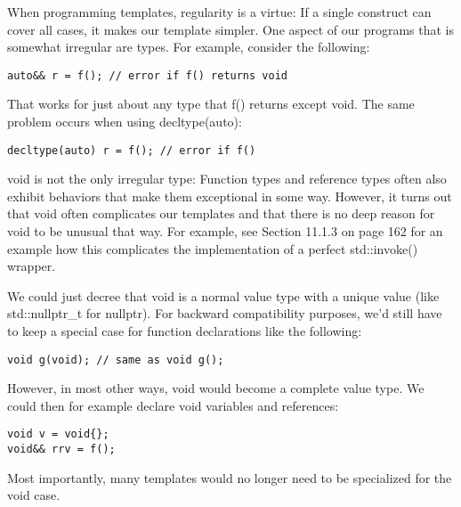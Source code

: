 When programming templates, regularity is a virtue: If a single construct can cover all cases, it makes our template simpler. One aspect of our programs that is somewhat irregular are types. For example, consider the following:

\begin{lstlisting}[style=styleCXX]
auto&& r = f(); // error if f() returns void
\end{lstlisting}

That works for just about any type that f() returns except void. The same problem occurs when using decltype(auto):

\begin{lstlisting}[style=styleCXX]
decltype(auto) r = f(); // error if f()
\end{lstlisting}

void is not the only irregular type: Function types and reference types often also exhibit behaviors that make them exceptional in some way. However, it turns out that void often complicates our templates and that there is no deep reason for void to be unusual that way. For example, see Section 11.1.3 on page 162 for an example how this complicates the implementation of a perfect std::invoke() wrapper.

We could just decree that void is a normal value type with a unique value (like std::nullptr\_t for nullptr). For backward compatibility purposes, we’d still have to keep a special case for function declarations like the following:

\begin{lstlisting}[style=styleCXX]
void g(void); // same as void g();
\end{lstlisting}

However, in most other ways, void would become a complete value type. We could then for example declare void variables and references:

\begin{lstlisting}[style=styleCXX]
void v = void{};
void&& rrv = f();
\end{lstlisting}

Most importantly, many templates would no longer need to be specialized for the void case.













































